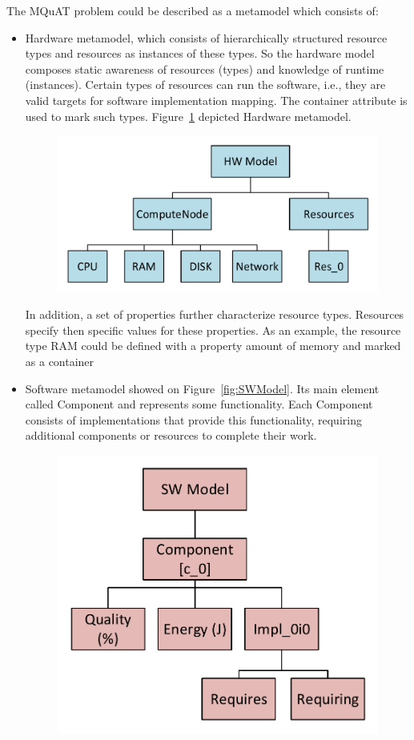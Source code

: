The MQuAT problem could be described as a metamodel which consists of:
\begin{itemize}
	\item Hardware metamodel, which consists of hierarchically structured resource types and resources as instances of these types. So the hardware model composes static awareness of resources (types) and knowledge of runtime (instances). Certain types of resources can run the software, i.e., they are valid targets for software implementation mapping. The container attribute is used to mark such types. Figure~\ref{fig:HWmodel} depicted Hardware metamodel.
	\begin{figure}
		\centering
		\includegraphics[width=\textwidth]{images/HWModel}
		\caption{}
		\label{fig:HWmodel}
	\end{figure}
	In addition, a set of properties further characterize resource types. Resources specify then specific values for these properties. As an example, the resource type RAM could be defined with a property amount of memory and marked as a container
	\item Software metamodel showed on Figure~\ref{fig:SWModel}. Its main element called Component and represents some functionality.
	Each Component consists of implementations that provide this functionality, requiring additional components or resources to complete their work. 
	\begin{figure}
		\centering
		\includegraphics[width=\textwidth]{images/SWModel}

\end{figure}
\end{itemize}
